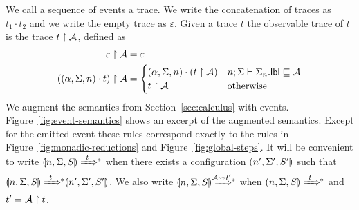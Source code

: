 We call a sequence of events a trace. We write the concatenation of traces as $t_1 \cdot t_2$ and we write the empty trace as $\varepsilon$. Given a trace $t$ the observable trace of $t$ is the trace $t \upharpoonright \mathcal{A}$, defined as
\begin{align*}
\varepsilon \upharpoonright \mathcal{A} &= \varepsilon\\
((\alpha, \Sigma, n) \cdot t) \upharpoonright \mathcal{A} &=
\begin{cases}
(\alpha, \Sigma, n) \cdot (t \upharpoonright \mathcal{A}) & n; \Sigma \vdash \Sigma_n.\mathsf{lbl} \sqsubseteq \mathcal{A} \\
t \upharpoonright \mathcal{A} & \text{otherwise}
\end{cases}
\end{align*}
We augment the semantics from Section~\ref{sec:calculus} with events. Figure~\ref{fig:event-semantics} shows an excerpt of the augmented semantics. Except for the emitted event these rules correspond exactly to the rules in Figure~\ref{fig:monadic-reductions} and Figure~\ref{fig:global-steps}. It will be convenient to write $\gconfig{n}{\env}{S} \gstepstos[][t]$ when there exists a configuration $\llparenthesis n', \Sigma', S' \rrparenthesis$ such that $\gconfig{n}{\env}{S} \gstepstos[][t] \gconfig{n'}{\env'}{S'}$. We also write $\gconfig{n}{\env}{S} \gstepstos[][\Attacker \filtertrace t']$ when $\gconfig{n}{\env}{S} \gstepstos[][t]$ and $t' = \mathcal{A} \upharpoonright t$.

